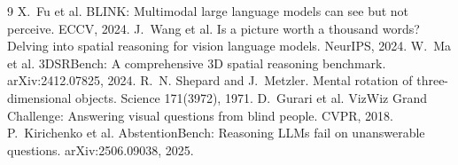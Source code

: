 \documentclass[10pt,twocolumn,letterpaper]{article}
\begin{document}
\small
\begin{thebibliography}{9}\setlength{\itemsep}{0pt}
 X.~Fu et al. BLINK: Multimodal large language models can see but not perceive. ECCV, 2024.
 J.~Wang et al. Is a picture worth a thousand words? Delving into spatial reasoning for vision language models. NeurIPS, 2024.
 W.~Ma et al. 3DSRBench: A comprehensive 3D spatial reasoning benchmark. arXiv:2412.07825, 2024.
 R.~N. Shepard and J.~Metzler. Mental rotation of three-dimensional objects. Science 171(3972), 1971.
 D.~Gurari et al. VizWiz Grand Challenge: Answering visual questions from blind people. CVPR, 2018.
 P.~Kirichenko et al. AbstentionBench: Reasoning LLMs fail on unanswerable questions. arXiv:2506.09038, 2025.
\end{thebibliography}
\end{document}
